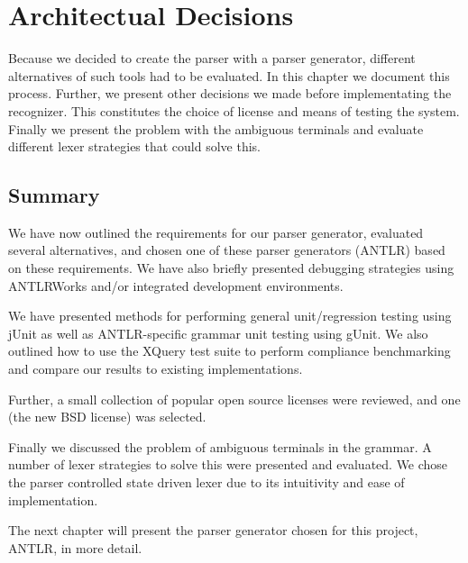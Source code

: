 \chapter{Architectual Decisions}
\label{chapter:method}
Because we decided to create the parser with a parser generator, different
alternatives of such tools had to be evaluated. In this chapter we
document this process. Further, we present other decisions we made before
implementating the recognizer. This constitutes the choice of license and means
of testing the system. Finally we present the problem with the ambiguous
terminals and evaluate different lexer strategies that could solve this.







\section{Summary}
We have now outlined the requirements for our parser generator, evaluated
several alternatives, and chosen one of these parser generators (ANTLR) based on
these requirements. We have also briefly presented debugging
strategies using ANTLRWorks and/or integrated development environments.

We have presented methods for performing general unit/regression testing
using jUnit as well as ANTLR-specific grammar unit testing using gUnit. We also
outlined how to use the XQuery test suite to perform compliance
benchmarking and compare our results to existing implementations.

Further, a small collection of popular open source licenses were reviewed, and
one (the new BSD license) was selected.

Finally we discussed the problem of ambiguous terminals in the grammar. A number of lexer strategies to solve this were presented and evaluated. We chose the parser controlled state driven lexer due to its intuitivity and ease of implementation.

The next chapter will present the parser generator chosen for this
project, ANTLR, in more detail.